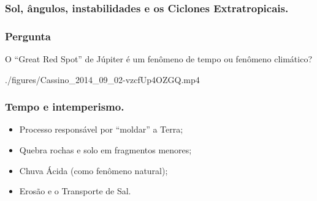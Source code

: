 \begin{frame}
\frametitle{Sol, ângulos, instabilidades e os Ciclones Extratropicais.}
\end{frame}

\begin{frame}
\frametitle{Pergunta}
  \begin{block}{}
    O ``Great Red Spot'' de Júpiter é um fenômeno de tempo ou fenômeno
    climático?
  \end{block}
\end{frame}

\begin{frame}
  \begin{center}
    \movie[showcontrols=true]{\shadowbox{\phantom{\rule{8cm}{5cm}}}}
  {./figures/Cassino_2014_09_02-vzcfUp4OZGQ.mp4}
  \end{center}
\end{frame}

\begin{frame}
\frametitle{Tempo e intemperismo.}
  \begin{itemize}[<+-| alert@+>]
    \item Processo responsável por ``moldar'' a Terra;
    \item Quebra rochas e solo em fragmentos menores;
    \item Chuva Ácida (como fenômeno natural);
    \item Erosão e o Transporte de Sal.
  \end{itemize}
\end{frame}

